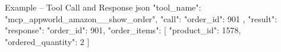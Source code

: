 
\newcommand{\tcolorboxPromptExampleToolCallTitleText}{}
\newcommand{\tcolorboxPromptExampleToolCallCommonText}{}
\newcommand{\tcolorboxPromptExampleToolCallTitleBeforeVspace}{}
\newcommand{\tcolorboxPromptExampleToolCallCommonTextLineSkip}{}

\begin{tcbCodeListing}{Example -- Tool Call and Response
}{json}
{
  "tool_name": "mcp_appworld_amazon__show_order",
  "call": {
    "order_id": 901
  },
  "result": {
    "response": {
      "order_id": 901,
      "order_items": [
        {
          "product_id": 1578,
          "ordered_quantity": 2
        }
      ]
    }
  }
}
\end{tcbCodeListing}